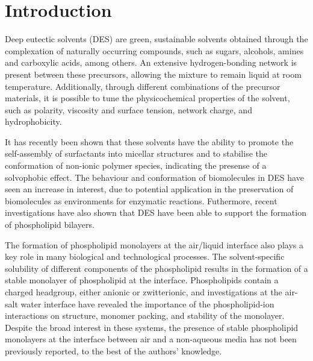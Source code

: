 \documentclass[twoside,twocolumn,9pt]{article}
\begin{document}

\section{Introduction}
Deep eutectic solvents (DES) are green, sustainable solvents obtained through the complexation of naturally occurring compounds, such as sugars, alcohols, amines and carboxylic acids, among others.\cite{Smith2014, Dai2013} An extensive hydrogen-bonding network is present between these precursors, allowing the mixture to remain liquid at room temperature.\cite{Hammond2016, Hammond2017, Araujo2017} Additionally, through different combinations of the precursor materials, it is possible to tune the physicochemical properties of the solvent, such as polarity,\cite{Pandey2014} viscosity and surface tension,\cite{Smith2014} network charge,\cite{Zahn2016} and hydrophobicity.\cite{Ribeiro2015,vanOsch2015} 

It has recently been shown that these solvents have the ability to promote the self-assembly of surfactants into micellar structures\cite{Sanchez-Fernandez2016,Arnold2015} and to stabilise the conformation of non-ionic polymer species,\cite{Sapir2016} indicating the presense of a solvophobic effect. The behaviour and conformation of biomolecules in DES have seen an increase in interest,\cite{Esquembre2013,Gorke2010,Gorke2008,Monhami2014,Wu2014,Harifi-Mood2017,Milano2017,Sanchez-Fernandez2017} due to potential application in the preservation of biomolecules as environments for enzymatic reactions.\cite{Merza2018} Futhermore, recent investigations have also shown that DES have been able to support the formation of phospholipid bilayers.\cite{Bryant2017,Bryant2016,Gutierrez2009} 

The formation of phospholipid monolayers at the air/liquid interface also plays a key role in many biological and technological processes. The solvent-specific solubility of different components of the phospholipid results in the formation of a stable monolayer of phospholipid at the interface.\cite{Mohwald1990} Phospholipids contain a charged headgroup, either anionic or zwitterionic, and investigations at the air-salt water interface have revealed the importance of the phospholipid-ion interactions on structure, monomer packing, and stability of the monolayer.\cite{Mohwald1990,Kewalramani2010} Despite the broad interest in these systems, the presence of stable phospholipid monolayers at the interface between air and a non-aqueous media has not been previously reported, to the best of the authors' knowledge. 
\end{document}

